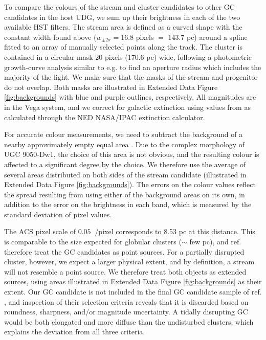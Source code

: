 \documentclass[pdflatex,sn-mathphys-num]{sn-jnl}
\theoremstyle{thmstyleone}
\DeclareMathOperator{\arcsec}{^{\prime\prime}}
\theoremstyle{thmstyletwo}
\theoremstyle{thmstylethree}
\begin{document}
To compare the colours of the stream and cluster candidates to other GC candidates in the host UDG, we sum up their brightness in each of the two available HST filters. The stream area is defined as a curved shape with the constant width found above ($w_{\pm 2\sigma} = $16.8 pixels $=$ 143.7 pc) around a spline fitted to an array of manually selected points along the track. The cluster is contained in a circular mask 20 pixels (170.6 pc) wide, following a photometric growth-curve analysis similar to e.g. \citep{Johnson2012} to find an aperture radius which includes the majority of the light. We make sure that the masks of the stream and progenitor do not overlap. Both masks are illustrated in Extended Data Figure \ref{fig:backgrounds} with blue and purple outlines, respectively.
All magnitudes are in the Vega system, and we correct for galactic extinction using values from \citep{SchlaflyFinkbeiner2011} as calculated through the NED NASA/IPAC extinction calculator.

For accurate colour measurements, we need to subtract the background
of a nearby approximately empty equal area  \citep[see e.g.,][]{Bonaca2020}. Due to the complex morphology of UGC 9050-Dw1, the choice of this area is not obvious, and the resulting colour is affected to a significant degree by the choice. We therefore use the average of several areas distributed on both sides of the stream candidate (illustrated in Extended Data Figure \ref{fig:backgrounds}). The errors on the colour values reflect the spread resulting from using either of the background areas on its own, in addition to the error on the brightness in each band, which is measured by the standard deviation of pixel values.

The ACS pixel scale of $0.05\arcsec$/pixel corresponds to 8.53 pc at this distance. This is comparable to the size expected for globular clusters ($\sim $ few pc)\citep{Brodie2006}, and ref. \citep{Fielder2023} therefore treat the GC candidates as point sources. For a partially disrupted cluster, however, we expect a larger physical extent, and by definition, a stream will not resemble a point source. We therefore treat both objects as extended sources, using areas illustrated in Extended Data Figure \ref{fig:backgrounds} as their extent.
Our GC candidate is not included in the final GC candidate sample of ref. \citep{Fielder2023}, and inspection of their selection criteria reveals that it is discarded based on roundness, sharpness, and/or magnitude uncertainty.
A tidally disrupting GC would be both elongated and more diffuse than the undisturbed clusters, which explains the deviation from all three criteria.
\end{document}
